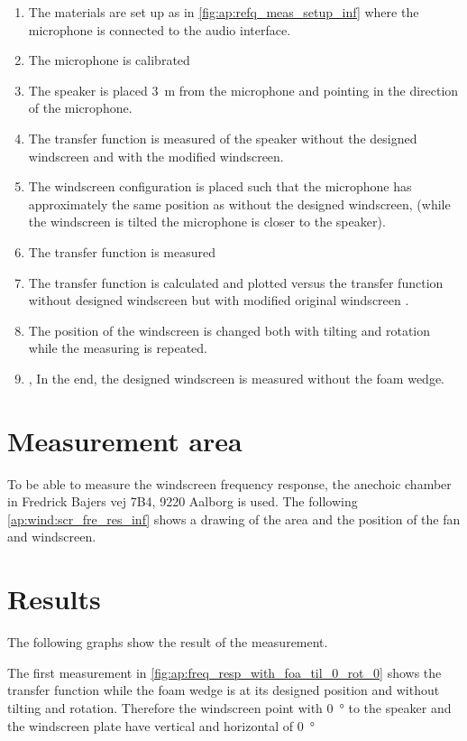 \begin{enumerate}
\item The materials are set up as in \autoref{fig:ap:refq_meas_setup_inf} where the microphone is connected to the audio interface.
\item The microphone is calibrated
\item The speaker is placed \SI{3}{\meter} from the microphone and pointing in the direction of the microphone.
\item The transfer function is measured of the speaker without the designed windscreen and with the modified windscreen.
\item    The windscreen configuration is placed such that the microphone has approximately the same position as without the designed windscreen, (while the windscreen is tilted the microphone is closer to the speaker).
\item The transfer function is measured 
\item The transfer function is calculated and plotted versus the transfer function without designed windscreen but with modified original windscreen \matlab.
\item The position of the windscreen is changed both with tilting and rotation while the measuring is repeated.
\item, In the end, the designed windscreen is measured without the foam wedge.
\end{enumerate}


\section*{Measurement area}
To be able to measure the windscreen frequency response, the anechoic chamber in Fredrick Bajers vej 7B4, 9220 Aalborg is used. The following \autoref{ap:wind:scr_fre_res_inf} shows a drawing of the area and the position of the fan and windscreen.


\section*{Results}

The following graphs show the result of the measurement. 


The first measurement in \autoref{fig:ap:freq_resp_with_foa_til_0_rot_0} shows the transfer function while the foam wedge is at its designed position and without tilting and rotation. Therefore the windscreen point with \SI{0}{\degree} to the speaker and the windscreen plate have vertical and horizontal of \SI{0}{\degree} 



